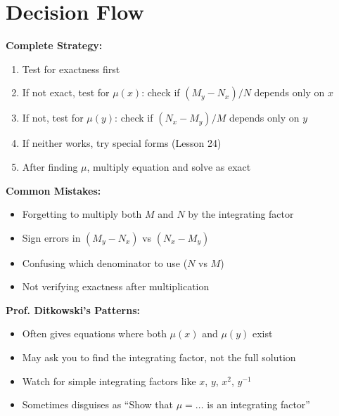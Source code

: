 \documentclass[12pt]{article}
\begin{document}
\section{Decision Flow}

\begin{algorithm}
\textbf{Complete Strategy:}
\begin{enumerate}
    \item Test for exactness first
    \item If not exact, test for $\mu(x)$: check if $(M_y - N_x)/N$ depends only on $x$
    \item If not, test for $\mu(y)$: check if $(N_x - M_y)/M$ depends only on $y$
    \item If neither works, try special forms (Lesson 24)
    \item After finding $\mu$, multiply equation and solve as exact
\end{enumerate}
\end{algorithm}

\begin{warning}
\textbf{Common Mistakes:}
\begin{itemize}
    \item Forgetting to multiply both $M$ and $N$ by the integrating factor
    \item Sign errors in $(M_y - N_x)$ vs $(N_x - M_y)$
    \item Confusing which denominator to use ($N$ vs $M$)
    \item Not verifying exactness after multiplication
\end{itemize}
\end{warning}

\begin{examtip}
\textbf{Prof. Ditkowski's Patterns:}
\begin{itemize}
    \item Often gives equations where both $\mu(x)$ and $\mu(y)$ exist
    \item May ask you to find the integrating factor, not the full solution
    \item Watch for simple integrating factors like $x$, $y$, $x^2$, $y^{-1}$
    \item Sometimes disguises as ``Show that $\mu = \ldots$ is an integrating factor''
\end{itemize}
\end{examtip}
\end{document}
